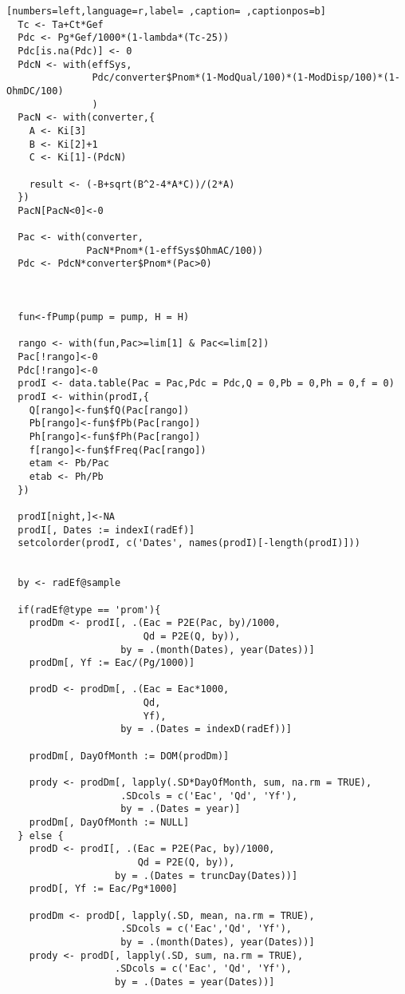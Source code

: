 \begin{lstlisting}[numbers=left,language=r,label= ,caption= ,captionpos=b]
  Tc <- Ta+Ct*Gef
  Pdc <- Pg*Gef/1000*(1-lambda*(Tc-25))
  Pdc[is.na(Pdc)] <- 0 
  PdcN <- with(effSys,
               Pdc/converter$Pnom*(1-ModQual/100)*(1-ModDisp/100)*(1-OhmDC/100)
               )
  PacN <- with(converter,{
    A <- Ki[3]
    B <- Ki[2]+1
    C <- Ki[1]-(PdcN)

    result <- (-B+sqrt(B^2-4*A*C))/(2*A)
  })
  PacN[PacN<0]<-0

  Pac <- with(converter,
              PacN*Pnom*(1-effSys$OhmAC/100))
  Pdc <- PdcN*converter$Pnom*(Pac>0)



  fun<-fPump(pump = pump, H = H)

  rango <- with(fun,Pac>=lim[1] & Pac<=lim[2]) 
  Pac[!rango]<-0
  Pdc[!rango]<-0
  prodI <- data.table(Pac = Pac,Pdc = Pdc,Q = 0,Pb = 0,Ph = 0,f = 0)	
  prodI <- within(prodI,{
    Q[rango]<-fun$fQ(Pac[rango])
    Pb[rango]<-fun$fPb(Pac[rango])
    Ph[rango]<-fun$fPh(Pac[rango])
    f[rango]<-fun$fFreq(Pac[rango])
    etam <- Pb/Pac
    etab <- Ph/Pb
  })

  prodI[night,]<-NA
  prodI[, Dates := indexI(radEf)]
  setcolorder(prodI, c('Dates', names(prodI)[-length(prodI)]))


  by <- radEf@sample

  if(radEf@type == 'prom'){
    prodDm <- prodI[, .(Eac = P2E(Pac, by)/1000,
                        Qd = P2E(Q, by)),
                    by = .(month(Dates), year(Dates))]
    prodDm[, Yf := Eac/(Pg/1000)]

    prodD <- prodDm[, .(Eac = Eac*1000,
                        Qd,
                        Yf),
                    by = .(Dates = indexD(radEf))]

    prodDm[, DayOfMonth := DOM(prodDm)]

    prody <- prodDm[, lapply(.SD*DayOfMonth, sum, na.rm = TRUE),
                    .SDcols = c('Eac', 'Qd', 'Yf'),
                    by = .(Dates = year)]
    prodDm[, DayOfMonth := NULL]
  } else {
    prodD <- prodI[, .(Eac = P2E(Pac, by)/1000,
                       Qd = P2E(Q, by)),
                   by = .(Dates = truncDay(Dates))]
    prodD[, Yf := Eac/Pg*1000]

    prodDm <- prodD[, lapply(.SD, mean, na.rm = TRUE),
                    .SDcols = c('Eac','Qd', 'Yf'),
                    by = .(month(Dates), year(Dates))]
    prody <- prodD[, lapply(.SD, sum, na.rm = TRUE),
                   .SDcols = c('Eac', 'Qd', 'Yf'),
                   by = .(Dates = year(Dates))]


\end{lstlisting}

